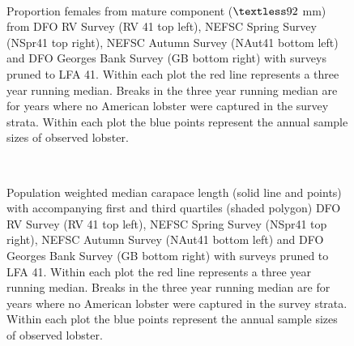 \documentclass[11pt]{article}
\newcommand{\D}{.}
\newcommand{\e}{/backup/bio_data/bio.lobster/figures/} %
\begin{document}
\begin{figure}
\centering
{}\\

\caption{Proportion females from mature component ($ \textless 92$ mm) from DFO RV Survey (RV 41 top left), NEFSC Spring Survey (NSpr41 top right), NEFSC Autumn Survey (NAut41 bottom left) and DFO Georges Bank Survey (GB bottom right) with surveys pruned to LFA 41. Within each plot the red line represents a three year running median. Breaks in the three year running median are for years where no American lobster were captured in the survey strata. Within each plot the blue points represent the annual sample sizes of observed lobster.}

\end{figure}
\clearpage




\begin{figure}
\centering
{}\\

\caption{Population weighted median carapace length (solid line and points) with accompanying first and third quartiles (shaded polygon) DFO RV Survey (RV 41 top left), NEFSC Spring Survey (NSpr41 top right), NEFSC Autumn Survey (NAut41 bottom left) and DFO Georges Bank Survey (GB bottom right) with surveys pruned to LFA 41. Within each plot the red line represents a three year running median. Breaks in the three year running median are for years where no American lobster were captured in the survey strata. Within each plot the blue points represent the annual sample sizes of observed lobster.}
\end{figure}
\clearpage
\end{document}
